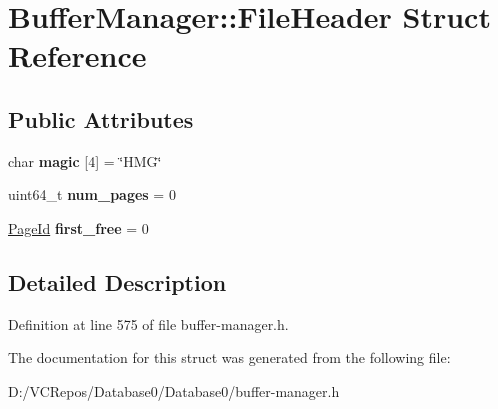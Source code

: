 \hypertarget{struct_buffer_manager_1_1_file_header}{}\section{Buffer\+Manager\+::File\+Header Struct Reference}
\label{struct_buffer_manager_1_1_file_header}
\subsection*{Public Attributes}
\begin{DoxyCompactItemize}
\item 
\mbox{\label{struct_buffer_manager_1_1_file_header_ae0fc2117f18e9046b88043eb638787eb}} 
char {\bfseries magic} \mbox{[}4\mbox{]} = \char`\"{}H\+MG\char`\"{}
\item 
\mbox{\label{struct_buffer_manager_1_1_file_header_adc8b933ab21ae98c6cdb553b6fa362c2}} 
uint64\+\_\+t {\bfseries num\+\_\+pages} = 0
\item 
\mbox{\label{struct_buffer_manager_1_1_file_header_a604b2527912468d123207f96428017af}} 
\mbox{\hyperlink{struct_generic_i_o_id}{Page\+Id}} {\bfseries first\+\_\+free} = 0
\end{DoxyCompactItemize}


\subsection{Detailed Description}


Definition at line 575 of file buffer-\/manager.\+h.



The documentation for this struct was generated from the following file\+:\begin{DoxyCompactItemize}
\item 
D\+:/\+V\+C\+Repos/\+Database0/\+Database0/buffer-\/manager.\+h\end{DoxyCompactItemize}
